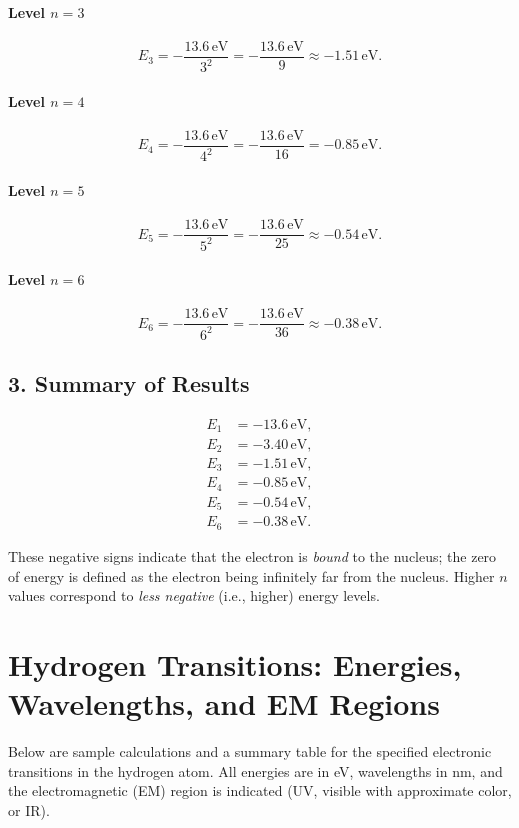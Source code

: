 \documentclass[12pt]{article}
\theoremstyle{definition} %
\theoremstyle{plain} %
\begin{document}
\paragraph{Level \(n=3\)}
\[
E_3 
= -\frac{13.6\,\text{eV}}{3^2} 
= -\frac{13.6\,\text{eV}}{9} 
\approx -1.51\,\text{eV}.
\]

\paragraph{Level \(n=4\)}
\[
E_4 
= -\frac{13.6\,\text{eV}}{4^2} 
= -\frac{13.6\,\text{eV}}{16} 
= -0.85\,\text{eV}.
\]

\paragraph{Level \(n=5\)}
\[
E_5 
= -\frac{13.6\,\text{eV}}{5^2} 
= -\frac{13.6\,\text{eV}}{25} 
\approx -0.54\,\text{eV}.
\]

\paragraph{Level \(n=6\)}
\[
E_6 
= -\frac{13.6\,\text{eV}}{6^2} 
= -\frac{13.6\,\text{eV}}{36} 
\approx -0.38\,\text{eV}.
\]

\subsection*{3. Summary of Results}
\[
\begin{aligned}
E_1 &= -13.6\,\text{eV}, \\
E_2 &= -3.40\,\text{eV}, \\
E_3 &= -1.51\,\text{eV}, \\
E_4 &= -0.85\,\text{eV}, \\
E_5 &= -0.54\,\text{eV}, \\
E_6 &= -0.38\,\text{eV}.
\end{aligned}
\]

\noindent
These negative signs indicate that the electron is \emph{bound} to the nucleus; 
the zero of energy is defined as the electron being infinitely far from the nucleus. 
Higher \(n\) values correspond to \emph{less negative} (i.e., higher) energy levels.

\section*{Hydrogen Transitions: Energies, Wavelengths, and EM Regions}

Below are sample calculations and a summary table for the specified electronic transitions in the hydrogen atom. 
All energies are in eV, wavelengths in nm, and the electromagnetic (EM) region is indicated (UV, visible with approximate color, or IR).
\end{document}
